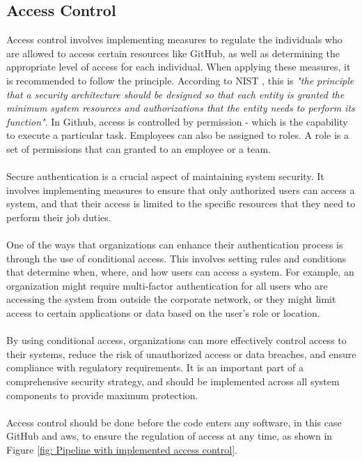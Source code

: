 \subsection{Access Control}
Access control involves implementing measures to regulate the individuals who are allowed to access certain resources like GitHub, as well as determining the appropriate level of access for each individual. When applying these measures, it is recommended to follow the  principle. According to NIST \cite{leastprivilege}, this is \textit{"the principle that a security architecture should be designed so that each entity is granted the minimum system resources and authorizations that the entity needs to perform its function"}. In Github, access is controlled by permission - which is the capability to execute a particular task. Employees can also be assigned to roles. A role is a set of permissions that can granted to an employee or a team. \cite{accesscontroll}
\\~\\
Secure authentication is a crucial aspect of maintaining system security. It involves implementing measures to ensure that only authorized users can access a system, and that their access is limited to the specific resources that they need to perform their job duties.
\\~\\
One of the ways that organizations can enhance their authentication process is through the use of conditional access. This involves setting rules and conditions that determine when, where, and how users can access a system. For example, an organization might require multi-factor authentication for all users who are accessing the system from outside the corporate network, or they might limit access to certain applications or data based on the user's role or location.
\\~\\
By using conditional access, organizations can more effectively control access to their systems, reduce the risk of unauthorized access or data breaches, and ensure compliance with regulatory requirements. It is an important part of a comprehensive security strategy, and should be implemented across all system components to provide maximum protection.
\\~\\
Access control should be done before the code enters any software, in this case GitHub and \acrshort{aws}, to ensure the regulation of access at any time, as shown in Figure \ref{fig: Pipeline with implemented access control}.

